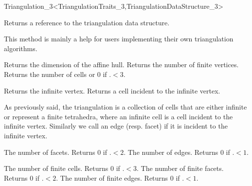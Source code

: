\begin{ccRefClass}{Triangulation_3<TriangulationTraits_3,TriangulationDataStructure_3>}
\begin{ccAdvanced}
{Returns a reference to the triangulation data structure.}

This method is mainly a help for users implementing their own triangulation
algorithms.
 
\end{ccAdvanced}


{Returns the dimension of the affine hull.}
\ccGlue
{}
{Returns the number of finite vertices.}
\ccGlue
{}
{Returns the number of cells or 0 if \ccVar.$<3$.}

{Returns the infinite vertex.}
\ccGlue
{}
{Returns a cell incident to the infinite vertex.}


As previously said, the triangulation is a collection of cells that
are either infinite or represent a finite tetrahedra, where an
infinite cell is a 
cell incident to the infinite vertex. Similarly we call
an edge (resp. facet)  if it is incident to the infinite vertex.

{The number of facets. Returns 0 if \ccVar.$<2$.}
\ccGlue
{}
{The number of edges. Returns 0 if \ccVar.$<1$.}

{The number of finite cells. Returns 0 if \ccVar.$<3$.}
\ccGlue
{}
{The number of finite facets. Returns 0 if \ccVar.$<2$.}
\ccGlue
{}
{The number of finite edges. Returns 0 if \ccVar.$<1$.}



\end{ccRefClass}
